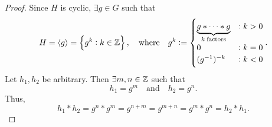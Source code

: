 \documentclass[11pt,openany]{article}
\begin{document}
\newpage

\newpage
{}

\begin{proof}
	Since $H$ is cyclic, $\exists g\in G$ such that \[
	H=\langle g \rangle=\set{g^k:k\in\mathbb{Z}},\quad\text{where}\quad g^k:=\begin{cases}
		\underbrace{g\ast\cdots\ast g}_{k\; \text{factors}} & :k>0 \\
		0 &: k=0 \\
		(g^{-1})^{-k} &: k < 0
	\end{cases}.
	\] Let $h_1,h_2$ be arbitrary. Then $\exists m,n\in\mathbb{Z}$ such that \[
	h_1=g^m\quad\text{and}\quad h_2=g^n.
	\] Thus, \[
	h_1\ast h_2=g^n\ast g^m=g^{n+m}=g^{m+n}=g^m\ast g^n=h_2\ast h_1.
	\]
\end{proof}
\end{document}
